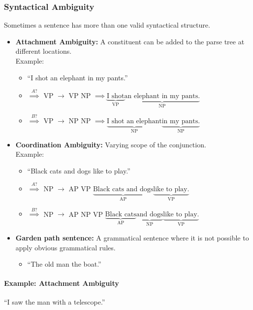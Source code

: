 			\subsubsection{Syntactical Ambiguity} %
				Sometimes a sentence has more than one valid syntactical structure.
				\begin{itemize}
					\item \textbf{Attachment Ambiguity:} A constituent can be added to the parse tree at different locations. \\ Example:
						\begin{itemize}
							\item \enquote{I shot an elephant in my pants.}
							\item[] \( \overset{A?}{\implies} \) VP \(\rightarrow\) VP NP \( \implies \underbrace{\text{I shot}}_{\text{VP}} \underbrace{\text{an elephant in my pants.}}_{\text{NP}} \)
							\item[] \( \overset{B?}{\implies} \) VP \(\rightarrow\) NP NP \( \implies \underbrace{\text{I shot an elephant}}_{\text{NP}} \underbrace{\text{in my pants.}}_{\text{NP}} \)
						\end{itemize}
					\item \textbf{Coordination Ambiguity:} Varying scope of the conjunction. \\ Example:
						\begin{itemize}
							\item \enquote{Black cats and dogs like to play.}
							\item[] \( \overset{A?}{\implies} \) NP \(\rightarrow\) AP VP \( \underbrace{\text{Black cats and dogs}}_{\text{AP}} \underbrace{\text{like to play.}}_{\text{VP}} \)
							\item[] \( \overset{B?}{\implies} \) NP \(\rightarrow\) AP NP VP \( \underbrace{\text{Black cats}}_{\text{AP}} \underbrace{\text{and dogs}}_{\text{NP}} \underbrace{\text{like to play.}}_{\text{VP}} \)
						\end{itemize}
					\item \textbf{Garden path sentence:} A grammatical sentence where it is not possible to apply obvious grammatical rules.
						\begin{itemize}
							\item \enquote{The old man the boat.}
						\end{itemize}
				\end{itemize}

				\paragraph{Example: Attachment Ambiguity}
					\enquote{I saw the man with a telescope.}

